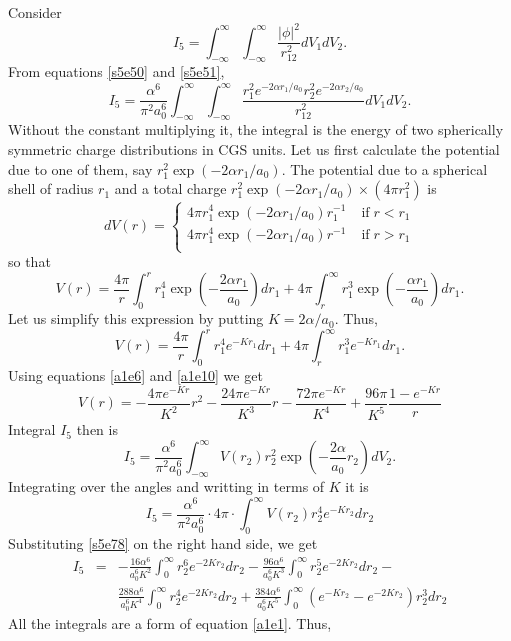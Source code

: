 \documentclass{article}
\numberwithin{equation}{section}
\begin{document}
Consider
\[
I_5 = \int_{-\infty}^\infty\int_{-\infty}^\infty \frac{|\phi|^2}{r_{12}^2}
dV_1 dV_2.
\]
From equations \eqref{s5e50} and \eqref{s5e51},
\[
I_5 = \frac{\alpha^6}{\pi^2 a_0^6}
\int_{-\infty}^\infty\int_{-\infty}^\infty
\frac{r_1^2e^{-2\alpha r_1/a_0}r_2^2e^{-2\alpha r_2/a_0}}{r_{12}^2}
dV_1 dV_2.
\]
Without the constant multiplying it, the integral is the energy of two
spherically symmetric charge distributions in CGS units. Let us first
calculate the potential due to one of them, say 
$r_1^2\exp(-2\alpha r_1/a_0)$. The potential due to a spherical shell of 
radius $r_1$ and a total charge $r_1^2\exp(-2\alpha r_1/a_0)\times 
(4\pi r_1^2)$ is
\begin{equation}\label{s5e77}
dV(r) = \begin{cases}
4\pi r_1^4\exp(-2\alpha r_1/a_0) r_1^{-1} & \;\text{if}\; r < r_1 \\
4\pi r_1^4\exp(-2\alpha r_1/a_0) r^{-1} & \;\text{if}\; r > r_1 \\
\end{cases}
\end{equation}
so that
\[
V(r) = \frac{4\pi}{r}\int_0^r r_1^4\exp\left(-\frac{2\alpha r_1}{a_0}
       \right)dr_1 + 4\pi\int_r^\infty r_1^3\exp\left(-\frac{\alpha r_1}
       {a_0}\right)dr_1.
\]
Let us simplify this expression by putting $K = 2\alpha/a_0$. Thus,
\[
V(r) = \frac{4\pi}{r}\int_0^r r_1^4e^{-Kr_1}dr_1 + 
       4\pi\int_r^\infty r_1^3 e^{-Kr_1}dr_1.
\]
Using equations \eqref{a1e6} and \eqref{a1e10} we get
\begin{equation}\label{s5e78}
V(r) = -\frac{4\pi e^{-Kr}}{K^2}r^2 - \frac{24\pi e^{-Kr}}{K^3}r - 
       \frac{72\pi e^{-Kr}}{K^4} + \frac{96\pi}{K^5}\frac{1 - e^{-Kr}}{r}
\end{equation}
Integral $I_5$ then is
\[
I_5 = \frac{\alpha^6}{\pi^2 a_0^6}\int_{-\infty}^\infty V(r_2)r_2^2
\exp\left(-\frac{2\alpha}{a_0}r_2\right)dV_2.
\]
Integrating over the angles and writting in terms of $K$ it is
\[
I_5 = \frac{\alpha^6}{\pi^2 a_0^6}\cdot 4\pi\cdot 
      \int_0^\infty V(r_2)r_2^4 e^{-Kr_2} dr_2
\]
Substituting \eqref{s5e78} on the right hand side, we get
\begin{eqnarray*}
I_5 &=& -\frac{16\alpha^6}{a_0^6K^2}\int_0^\infty r_2^6e^{-2Kr_2}dr_2 - 
  \frac{96\alpha^6}{a_0^6K^3}\int_0^\infty r_2^5e^{-2Kr_2}dr_2 - \\
 & & \frac{288\alpha^6}{a_0^6K^4}\int_0^\infty r_2^4e^{-2Kr_2}dr_2 + 
 \frac{384\alpha^6}{a_0^6 K^5}\int_0^\infty(e^{-Kr_2}-e^{-2Kr_2})r_2^3dr_2
\end{eqnarray*}
All the integrals are a form of equation \eqref{a1e1}. Thus,
\end{document}
